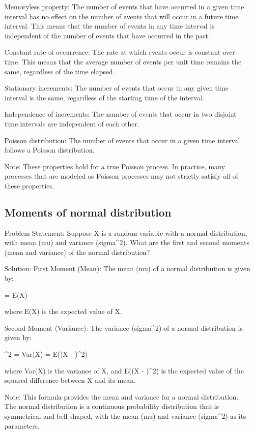 \documentclass[12pt, a4paper, oneside]{article}
\begin{document}
Memoryless property: The number of events that have occurred in a given time interval has no effect on the number of events that will occur in a future time interval. This means that the number of events in any time interval is independent of the number of events that have occurred in the past.

Constant rate of occurrence: The rate at which events occur is constant over time. This means that the average number of events per unit time remains the same, regardless of the time elapsed.

Stationary increments: The number of events that occur in any given time interval is the same, regardless of the starting time of the interval.

Independence of increments: The number of events that occur in two disjoint time intervals are independent of each other.

Poisson distribution: The number of events that occur in a given time interval follows a Poisson distribution.

Note: These properties hold for a true Poisson process. In practice, many processes that are modeled as Poisson processes may not strictly satisfy all of these properties.
\subsection{ Moments of normal distribution }
Problem Statement:
Suppose X is a random variable with a normal distribution, with mean (mu) and variance (sigma^2). What are the first and second moments (mean and variance) of the normal distribution?

Solution:
First Moment (Mean):
The mean (mu) of a normal distribution is given by:

\mu = E(X)

where E(X) is the expected value of X.

Second Moment (Variance):
The variance (sigma^2) of a normal distribution is given by:

\sigma^2 = Var(X) = E((X - \mu)^2)

where Var(X) is the variance of X, and E((X - \mu)^2) is the expected value of the squared difference between X and its mean.

Note: This formula provides the mean and variance for a normal distribution. The normal distribution is a continuous probability distribution that is symmetrical and bell-shaped, with the mean (mu) and variance (sigma^2) as its parameters.
\end{document}
